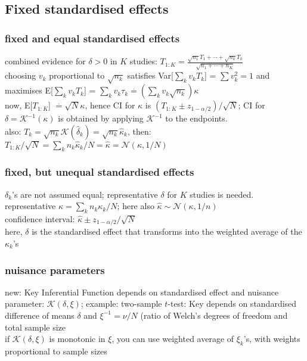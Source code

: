 \subsection{Fixed standardised effects}
\subsubsection{fixed and equal standardised effects}
combined evidence for $\delta > 0$ in $K$ studies: $T_{1:K}=\frac{\sqrt{n_1}T_1+\cdots+\sqrt{n_k}T_k}{\sqrt{n_1+\cdots+n_K}}$\\
choosing $v_k$ proportional to $\sqrt{n_k}$ satisfies Var[$\sum_k v_k T_k$] = $\sum v_k^2 = 1$ and maximises E[$\sum_k v_k T_k$] = $\sum_k v_k \tau_k \overset{.}{=} (\sum_k v_k \sqrt{n_k})\kappa$\\

now, E[$T_{1:K}$] $\overset{.}{=} \sqrt{N}\kappa$, hence CI for $\kappa$ is $(T_{1:K} \pm z_{1-\alpha/2})/\sqrt{N}$; CI for $\delta = \mathcal{K}^{-1}(\kappa)$ is obtained by applying $\mathcal{K}^{-1}$ to the endpoints.\\

also: $T_k = \sqrt{n_k}\mathcal{K}(\hat{\delta}_k) = \sqrt{n_k}\hat{\kappa}_k$, then: $T_{1:K}/\sqrt{N}=\sum_k n_k \hat{\kappa}_k/N = \hat{\kappa} = \mathcal{N}(\kappa,1/N)$

\subsubsection{fixed, but unequal standardised effects}

$\delta_k$'s are not assumed equal; representative $\delta$ for $K$ studies is needed.\\
representative $\kappa = \sum\limits_k n_k \kappa_k /N$; here also $\hat{\kappa}\sim \mathcal{N}(\kappa,1/n)$\\
confidence interval: $\hat{\kappa} \pm z_{1-\alpha/2}/\sqrt{N}$\\
here, $\delta$ is the standardised effect that transforms into the weighted average of the $\kappa_k$'s

\subsubsection{nuisance parameters}
new: Key Inferential Function depends on standardised effect and nuisance parameter: $\mathcal{K}(\delta,\xi)$; example: two-sample $t$-test: Key depends on standardised difference of means $\delta$ and $\xi^{-1} = \nu/N$ (ratio of Welch's degrees of freedom and total sample size\\
if $\mathcal{K}(\delta,\xi)$ is monotonic in $\xi$, you can use weighted average of $\xi_k$'s, with weights proportional to sample sizes\\

